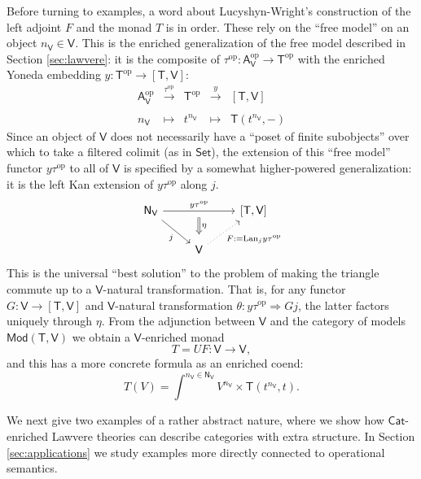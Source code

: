 \documentclass{amsart}
\theoremstyle{definition}
\newcommand{\Set}{\mathsf{Set}}
\newcommand{\Cat}{\mathsf{Cat}}
\newcommand{\Mod}{\mathsf{Mod}}
\newcommand{\NN}{\mathsf{N}}
\newcommand{\A}{\mathsf{A}}
\newcommand{\V}{\mathsf{V}}
\newcommand{\T}{\mathsf{T}}
\newcommand{\op}{\mathrm{op}}
\newcommand{\maps}{\colon}
\begin{document}
Before turning to examples, a word about Lucyshyn-Wright's construction of the left adjoint $F$ and the monad $T$ is in order.  These rely on the ``free model'' on an object $n_\V \in \V$.   This is the enriched generalization of the free model described in Section \ref{sec:lawvere}: it is the composite of $\tau^\op\maps \A_\V^\op \to \T^\op$ with the enriched Yoneda embedding $y\maps \T^\op \to [\T,\V]$:
\[
\begin{array}{rllll}
\A_\V^\op & \xrightarrow{\tau^\op} & \T^\op & \xrightarrow{y} & \left[\T,\V\right]\\
\\
n_\V & \mapsto & t^{n_\V} & \mapsto & \T(t^{n_\V},-)
\end{array}
\]
Since an object of $\V$ does not necessarily have a ``poset of finite subobjects'' over which to take a filtered colimit (as in $\Set$), the extension of this ``free model'' functor $y \tau^\op$ to all of $\V$ is specified by a somewhat higher-powered generalization: it is the left Kan extension of $y\tau^{\op}$ along $j$.
\[\begin{tikzcd}
\NN_\V \arrow[rr,"y\tau^\op"{name=y}] \arrow[swap,rd,"j"] & & \left[\T,\V\right]\\
& \V \arrow[swap,dotted, ru,"F:=\mathrm{Lan}_jy\tau^{\op}"] \arrow[Rightarrow,from=y,"\eta", shorten >=0.2cm,shorten <=.2cm]
\end{tikzcd}\]
This is the universal ``best solution'' to the problem of making the triangle commute up to a $\V$-natural transformation.  That is, for any functor $G \maps \V \to [\T,\V]$ and $\V$-natural transformation $\theta \maps y\tau^{\op} \Rightarrow Gj$, the latter factors uniquely through $\eta$.
From the adjunction between $\V$ and the category of models $\Mod(\T,\V)$ we obtain a $\V$-enriched monad
\[       T = U F \maps \V \to \V, \]
and this has a more concrete formula as an enriched coend:
\[
T(V) = \int^{n_\V\in \NN_\V} V^{n_\V} \times \T(t^{n_\V},t).
\]

We next give two examples of a rather abstract nature, where we show how $\Cat$-enriched Lawvere theories can describe categories with extra structure.   In Section \ref{sec:applications} we study examples more directly connected to operational semantics.
\end{document}
